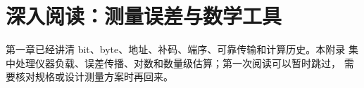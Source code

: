 \chapter{深入阅读：测量误差与数学工具}

第一章已经讲清 bit、byte、地址、补码、端序、可靠传输和计算历史。本附录
集中处理仪器负载、误差传播、对数和数量级估算；第一次阅读可以暂时跳过，
需要核对规格或设计测量方案时再回来。

\maybeskip

